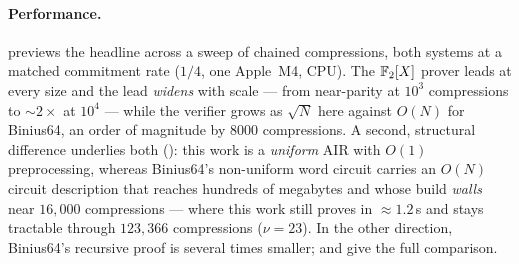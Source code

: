 \paragraph{Performance.}  previews the headline across a
sweep of chained compressions, both systems at a matched commitment rate
($1/4$, one Apple~M4, CPU). The $\mathbb{F}_2[X]$ prover leads at every size and the
lead \emph{widens} with scale --- from near-parity at $10^3$ compressions to
$\sim$$2\times$ at $10^4$ --- while the verifier grows as $\sqrt N$ here against
$O(N)$ for Binius64, an order of magnitude by $8000$ compressions. A second,
structural difference underlies both (): this work is a
\emph{uniform} AIR with $O(1)$ preprocessing, whereas Binius64's non-uniform
word circuit carries an $O(N)$ circuit description that reaches hundreds of
megabytes and whose build \emph{walls} near $16{,}000$ compressions --- where
this work still proves in $\approx 1.2$\,s and stays tractable through
$123{,}366$ compressions ($\nu = 23$). In the other direction, Binius64's
recursive proof is several times smaller;  and 
give the full comparison.

